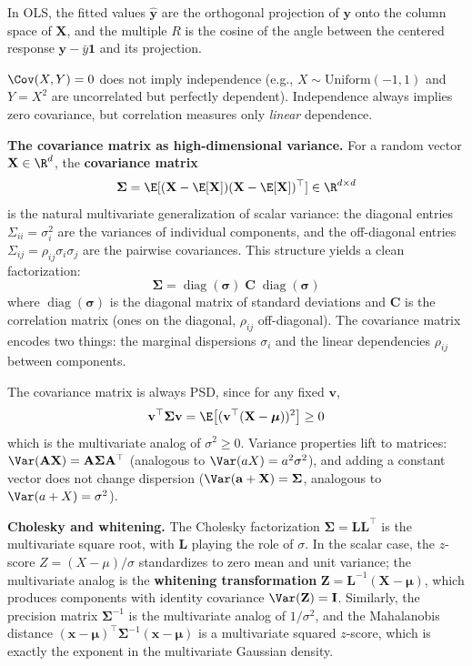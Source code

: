 \documentclass[main.tex]{subfiles}
\begin{document}
In OLS, the fitted values $\hat{\mathbf{y}}$ are the orthogonal projection of $\mathbf{y}$ onto the column space of $\mathbf{X}$, and the multiple $R$ is the cosine of the angle between the centered response $\mathbf{y} - \bar{y}\mathbf{1}$ and its projection.

$\Cov(X, Y) = 0$ does not imply independence (e.g., $X \sim \text{Uniform}(-1, 1)$ and $Y = X^2$ are uncorrelated but perfectly dependent). Independence always implies zero covariance, but correlation measures only \emph{linear} dependence.

\textbf{The covariance matrix as high-dimensional variance.} For a random vector $\mathbf{X} \in \R^d$, the \textbf{covariance matrix}
$$\boldsymbol{\Sigma} = \E[(\mathbf{X} - \E[\mathbf{X}])(\mathbf{X} - \E[\mathbf{X}])^\top] \in \R^{d \times d}$$
is the natural multivariate generalization of scalar variance: the diagonal entries $\Sigma_{ii} = \sigma_i^2$ are the variances of individual components, and the off-diagonal entries $\Sigma_{ij} = \rho_{ij}\sigma_i\sigma_j$ are the pairwise covariances. This structure yields a clean factorization:
$$\boldsymbol{\Sigma} = \operatorname{diag}(\boldsymbol{\sigma})\;\mathbf{C}\;\operatorname{diag}(\boldsymbol{\sigma})$$
where $\operatorname{diag}(\boldsymbol{\sigma})$ is the diagonal matrix of standard deviations and $\mathbf{C}$ is the correlation matrix (ones on the diagonal, $\rho_{ij}$ off-diagonal). The covariance matrix encodes two things: the marginal dispersions $\sigma_i$ and the linear dependencies $\rho_{ij}$ between components.

The covariance matrix is always PSD, since for any fixed $\mathbf{v}$,
$$\mathbf{v}^\top\boldsymbol{\Sigma}\mathbf{v} = \E\!\left[(\mathbf{v}^\top(\mathbf{X} - \boldsymbol{\mu}))^2\right] \geq 0$$
which is the multivariate analog of $\sigma^2 \geq 0$. Variance properties lift to matrices: $\Var(\mathbf{A}\mathbf{X}) = \mathbf{A}\boldsymbol{\Sigma}\mathbf{A}^\top$ (analogous to $\Var(aX) = a^2\sigma^2$), and adding a constant vector does not change dispersion ($\Var(\mathbf{a} + \mathbf{X}) = \boldsymbol{\Sigma}$, analogous to $\Var(a + X) = \sigma^2$).

\textbf{Cholesky and whitening.} The Cholesky factorization $\boldsymbol{\Sigma} = \mathbf{L}\mathbf{L}^\top$ is the multivariate square root, with $\mathbf{L}$ playing the role of $\sigma$. In the scalar case, the $z$-score $Z = (X - \mu)/\sigma$ standardizes to zero mean and unit variance; the multivariate analog is the \textbf{whitening transformation} $\mathbf{Z} = \mathbf{L}^{-1}(\mathbf{X} - \boldsymbol{\mu})$, which produces components with identity covariance $\Var(\mathbf{Z}) = \mathbf{I}$. Similarly, the precision matrix $\boldsymbol{\Sigma}^{-1}$ is the multivariate analog of $1/\sigma^2$, and the Mahalanobis distance $(\mathbf{x} - \boldsymbol{\mu})^\top\boldsymbol{\Sigma}^{-1}(\mathbf{x} - \boldsymbol{\mu})$ is a multivariate squared $z$-score, which is exactly the exponent in the multivariate Gaussian density.
\end{document}
